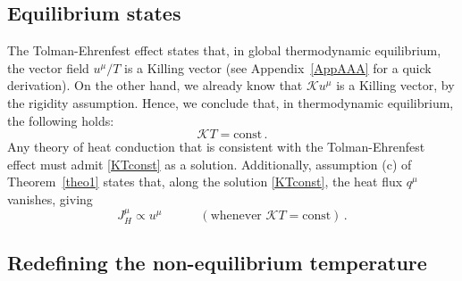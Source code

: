 \documentclass[a4paper, amsfonts, amssymb, amsmath, reprint, showkeys, nofootinbib, twoside, onecolumn,notitlepage]{revtex4-1}
\newcommand{\spc}{\quad \quad \quad}
\newcommand{\K}{{\mathcal{K}}}
\theoremstyle{definition}
\theoremstyle{theorem}
\begin{document}


\subsection{Equilibrium states}


The Tolman-Ehrenfest effect states that, in global thermodynamic equilibrium, the vector field $u^\mu/T$ is a Killing
vector \cite{TolmanLaw1930,Israel1981,BecattiniBeta2016,Santiago:2019aem,GavassinoGibbs2021,GavassinoStabilityCarter2022} (see Appendix~\ref{AppAAA} for a quick derivation). On the other hand, we already know that $\K u^\mu$ is a Killing vector, by
the rigidity assumption. Hence, we conclude that, in thermodynamic equilibrium, the following holds:
\begin{equation}\label{KTconst}
\K T =\text{const} \, .
\end{equation}
Any theory of heat conduction that is consistent with the Tolman-Ehrenfest effect must admit \eqref{KTconst} as a solution. Additionally, assumption (c) of Theorem~\ref{theo1} states that, along the solution \eqref{KTconst}, the heat flux $q^\mu$ vanishes, giving
\begin{equation}
J_H^\mu \propto  u^\mu \spc (\text{whenever }\K T=\text{const}) \, .
\end{equation}

\subsection{Redefining the non-equilibrium temperature}\label{nonequo}
\vspace{-0.2cm}
\end{document}
